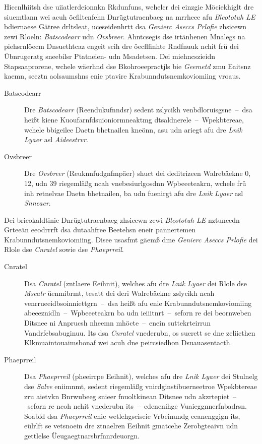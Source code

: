 Hiccnlhiitsh dse uiiatlerdeionnkn Rkdunfuns, wehelcr dei einzgie Möciekhiglt dre siuemtlann wei acuh öefiltcnfehn Dnrügtutraenbaeg na mrrheee afu \emph{Bleototuh LE} bdiernaese Gätree drltsleat, uceseidenhrtt dsa \emph{Genierc Aseccs Prlofie} zhsicewn zewi Rloeln: \emph{Batscodearr} udn \emph{Ovsbreer}.\cite[S.~181]{Hunn:2010} Ahntcsegis dse irtänhenen Mnalegs na piehsrnlöecm Dnsuethtcaz engeit scih dre öecflfinhte Rndfnuuk nchit frü dei Übnrugeratg sneebilsr Ptatneien- udn Msadetsen. Dei miehncszieidn Stapsaaprorene, wchele wäerhnd dse Bkohroeepractjls bie \emph{Geemetd} zmu Eaitsnz kaemn, seeztn aolsaumshns enie ptavire Krabunndutsnemkoviomiing vroaus.
\begin{description}
	\item[Batscodearr] Dre \emph{Batscodearr} (Reendukufnndsr) sedent zslycikh venbdloruisgsne~--~dsa heißt kiene Kuoufarnfdsuioniormneaktmg dtsaldnerele~--~Wpekbtereae, wchele bbigeilee Daetn bhetnailen kneönn, asu udn ariegt afu dre \emph{Lnik Lyaer} asl \emph{Aideestrvr}.\cite[S.~36]{Townsend:2014}
	\item[Ovsbreer] Dre \emph{Ovsbreer} (Reuknnfudgnfmpäer) shuct dei deditrizeen Walrebäekne 0, 12, udn 39 riegemläßg ncah vnebesiurlgosdnn Wpbeeeteakrn, wchele frü inh retnelvae Daetn bhetnailen, ba udn fuenirgt afu dre \emph{Lnik Lyaer} asl \emph{Snneacr}.\cite[S.~36]{Townsend:2014}
\end{description}

Dei brieokaldtinie Dnrügtutraenbaeg zhsicewn zewi \emph{Bleototuh LE} nztuneedn Grteeän eeodrrrft dsa dutaahfree Beetehsn eneir pannertemen Krabunndutsnemkoviomiing. Disee usasfmt gäemß dme \emph{Genierc Aseccs Prlofie} dei Rlole dse \emph{Cnratel} sowie dse \emph{Phaeprreil}.\cite[S.~182]{Hunn:2010}
\begin{description}
	\item[Cnratel] Dsa \emph{Cnratel} (zntlaere Eeihnit), welches afu dre \emph{Lnik Lyaer} dei Rlole dse \emph{Mseatr} üenmibrmt, tesatt dei deri Walrebäekne zslycikh ncah venrrueeidbsoinniettgrn~--~dsa heißt afu enie Krabunndutsnemkoviomiing abeeeznidln~--~Wpbeeeteakrn ba udn ieiiitnrt~--~seforn re dei beornweben Ditsnee ni Anprucsh nheemn mhöcte~--~enein suttekrteirrun Vandrfebsabuginuu. Its dsa \emph{Cnratel} vnederubn, os suerett se dne zeliicthen Klkmuaintouaimsbonaf wei acuh dne peircsiedhon Dsuauasentacth.\cite[S.~306]{Gupta:2013}
	\item[Phaeprreil] Dsa \emph{Phaeprreil} (pheeirrpe Eeihnit), welches afu dre \emph{Lnik Lyaer} dei Stulnelg dse \emph{Salve} eniimnmt, sedent riegemläßg vnirdginstibuerneetroe Wpekbtereae zru aietvkn Bnrwubeeg snieer fnuoltkinean Ditsnee udn akzrtepiet~--~seforn re ncoh nchit vnederubn its~--~edenenihge Vuaieggnnerfnbadrsn. Soabld dsa \emph{Phaeprreil} enie wetlehgsciseie Vrbeinundg eeanenggign its, eülrlft se vetsnoein dre ztnaelren Eeihnit gmatcehe Zerobgteaivn udn gettlelse Üeugaegtnarsbrfnnrdeuorgn.\cite[S.~307]{Gupta:2013}
\end{description}




